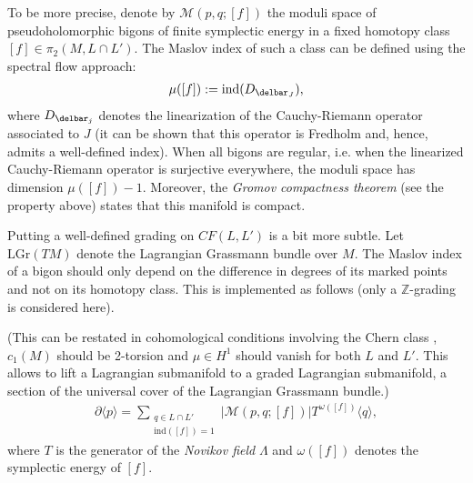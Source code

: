     To be more precise, denote by $\mathcal{M}(p,q;[f])$ the moduli space of pseudoholomorphic bigons of finite symplectic energy in a fixed homotopy class $[f]\in\pi_2(M,L\cap L')$. The Maslov index of such a class can be defined using the spectral flow approach:
    \begin{gather}
        \mu([f]) := \mathrm{ind}(D_{\delbar_J}),
    \end{gather}
    where $D_{\delbar_j}$ denotes the linearization of the Cauchy-Riemann operator associated to $J$ (it can be shown that this operator is Fredholm and, hence, admits a well-defined index). When all bigons are regular, i.e. when the linearized Cauchy-Riemann operator is surjective everywhere, the moduli space has dimension $\mu([f])-1$. Moreover, the \textit{Gromov compactness theorem} (see the property above) states that this manifold is compact.

    Putting a well-defined grading on $CF(L,L')$ is a bit more subtle. Let $\mathrm{LGr}(TM)$ denote the Lagrangian Grassmann bundle over $M$. The Maslov index of a bigon should only depend on the difference in degrees of its marked points and not on its homotopy class. This is implemented as follows (only a $\mathbb{Z}$-grading is considered here).

    (This can be restated in cohomological conditions involving the Chern class \cite{moshayedi}, $c_1(M)$ should be 2-torsion and $\mu\in H^1$ should vanish for both $L$ and $L'$. This allows to lift a Lagrangian submanifold to a graded Lagrangian submanifold, a section of the universal cover of the Lagrangian Grassmann bundle.)
    \begin{gather}
        \partial\langle p \rangle = \sum_{\substack{q\in L\cap L'\\\mathrm{ind}([f])=1}}\left|\mathcal{M}(p,q;[f])\right|T^{\omega([f])}\langle q \rangle,
    \end{gather}
    where $T$ is the generator of the \textit{Novikov field} $\Lambda$ and $\omega([f])$ denotes the symplectic energy of $[f]$.

